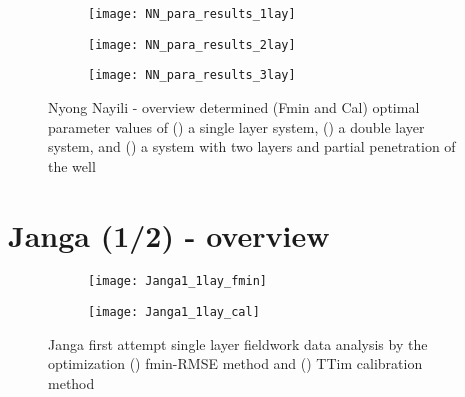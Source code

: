 \begin{figure}[h!]
	\centering
	\begin{subfigure}[b]{\linewidth}
		\centering\texttt{[image: NN\_para\_results\_1lay]}
		\captionsetup{justification=centering}		
		\caption{\label{fig:NN_para_results_1lay}}
		\end{subfigure}\vfill
	\begin{subfigure}[b]{\linewidth}
		\centering\texttt{[image: NN\_para\_results\_2lay]}
		\captionsetup{justification=centering}		
		\caption{\label{fig:NN_para_results_2lay}}
		\end{subfigure}
	\begin{subfigure}[b]{\linewidth}
		\centering\texttt{[image: NN\_para\_results\_3lay]}
		\captionsetup{justification=centering}		
		\caption{\label{fig:NN_para_results_3lay}}
		\end{subfigure}		
	\captionsetup{justification=centering}	
	\caption{Nyong Nayili - overview determined (Fmin and Cal) optimal parameter values of () a single layer system, () a double layer system, and () a system with two layers and partial penetration of the well} 
	\label{fig:NN_para_results}
\end{figure} 


\clearpage\section{Janga (1/2) - overview}
\label{sec:Janga1_overview}

\begin{figure}[h!]
	\centering
	\begin{subfigure}[b]{0.65\linewidth}
		\centering\texttt{[image: Janga1\_1lay\_fmin]}
		\captionsetup{justification=centering}		
		\caption{\label{fig:Janga1_1lay_fmin}}
		\end{subfigure}\vfill
	\begin{subfigure}[b]{0.65\linewidth}
		\centering\texttt{[image: Janga1\_1lay\_cal]}
		\captionsetup{justification=centering}		
		\caption{\label{fig:Janga1_1lay_cal}}
		\end{subfigure}
	\captionsetup{justification=centering}	
	\caption{Janga first attempt single layer fieldwork data analysis by the optimization () fmin-RMSE method and () TTim calibration method} 
	\label{fig:Janga1_1lay_analysis}
\end{figure} 

